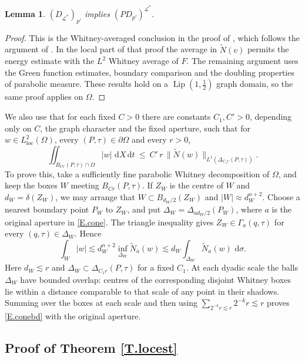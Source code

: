 \documentclass[10pt,a4paper]{amsart}
\numberwithin{equation}{section}
\DeclareMathOperator{\Lip}{Lip}
\DeclareMathOperator{\loc}{loc}
\newcommand{\abs}[1]{\left\vert#1\right\vert}
\newcommand{\om}{\Omega}
\newcommand{\pom}{\partial\Omega}
\newcommand{\LL}{\mathcal L}
\newcommand{\Nt}{\widetilde N}
\newcommand{\Gam}{\Gamma}
\renewcommand{\d}{\,\mathrm d}
\newtheorem{lemma}[equation]{Lemma}
\begin{document}
\begin{lemma}\label{L.PD}
$(D_{\LL^*})_{p'}$ implies $(PD_{p'})^{\LL^*}$.
\end{lemma}

\begin{proof}
This is the Whitney-averaged conclusion in the proof of
\cite[Lemma 3.8]{DLP2}, which follows the argument of \cite[\S3]{U}. In the
local part of that proof the average in $\Nt(v)$ permits the energy estimate
with the $L^2$ Whitney average of $F$. The remaining argument uses the Green
function estimates, boundary comparison and the doubling properties of
parabolic measure. These results hold on a $\Lip(1,\frac12)$ graph domain, so
the same proof applies on $\om$.
\end{proof}

\noindent We also use that for each fixed $C>0$ there are constants
$C_1,C'>0$, depending only on $C$, the graph character and the fixed aperture,
such that for $w\in L^2_{\loc}(\om)$, every $(P,\tau)\in\pom$ and every $r>0$,
\begin{equation}\label{E.conebd}
  \iint_{B_{Cr}(P,\tau)\cap\om}\abs w\,\d X\d t
  \ \le\ C'\,r\,\big\|\Nt(w)\big\|_{L^1(\Delta_{C_1r}(P,\tau))} .
\end{equation}
To prove this, take a sufficiently fine parabolic Whitney decomposition of
$\om$, and keep the boxes $W$ meeting $B_{Cr}(P,\tau)$. If $Z_W$ is the
centre of $W$ and $d_W=\delta(Z_W)$, we may arrange that
$W\subset B_{d_W/2}(Z_W)$ and $|W|\approx d_W^{n+2}$. Choose a nearest
boundary point $P_W$ to $Z_W$, and put $\Delta_W=\Delta_{ad_W/2}(P_W)$,
where $a$ is the original aperture in \eqref{E.cone}. The triangle inequality
gives $Z_W\in\Gam_a(q,\tau)$ for every $(q,\tau)\in\Delta_W$. Hence
\[
 \int_W|w|\lesssim d_W^{n+2}
       \inf_{\Delta_W}\Nt_a(w)
 \lesssim d_W\int_{\Delta_W}\Nt_a(w)\,\d\sigma.
\]
Here $d_W\lesssim r$ and $\Delta_W\subset\Delta_{C_1r}(P,\tau)$ for a
fixed $C_1$. At each dyadic scale the balls $\Delta_W$ have bounded overlap:
centres of the corresponding disjoint Whitney boxes lie within a distance
comparable to that scale of any point in their shadows. Summing over the
boxes at each scale and then using
$\sum_{2^{-k}r\lesssim r}2^{-k}r\lesssim r$ proves \eqref{E.conebd} with
the original aperture.\medskip

\subsection{Proof of Theorem \ref{T.locest}}\label{ss.locproof}
\end{document}
